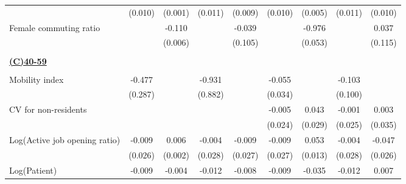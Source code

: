 \begin{tabular}{l*{8}{c}}
                    &     (0.010)         &     (0.001)         &     (0.011)         &     (0.009)         &     (0.010)         &     (0.005)         &     (0.011)         &     (0.010)         \\
\addlinespace
Female commuting ratio&                     &      -0.110\sym{***}&                     &      -0.039         &                     &      -0.976\sym{***}&                     &       0.037         \\
                    &                     &     (0.006)         &                     &     (0.105)         &                     &     (0.053)         &                     &     (0.115)         \\
\hline \\ \multicolumn{9}{l}{\textbf{\underline{(C)40-59}}} \\\\[-1ex]
Mobility index      &      -0.477\sym{*}  &                     &      -0.931         &                     &      -0.055         &                     &      -0.103         &                     \\
                    &     (0.287)         &                     &     (0.882)         &                     &     (0.034)         &                     &     (0.100)         &                     \\
\addlinespace
CV for non-residents&                     &                     &                     &                     &      -0.005         &       0.043         &      -0.001         &       0.003         \\
                    &                     &                     &                     &                     &     (0.024)         &     (0.029)         &     (0.025)         &     (0.035)         \\
\addlinespace
Log(Active job opening ratio)&      -0.009         &       0.006\sym{***}&      -0.004         &      -0.009         &      -0.009         &       0.053\sym{***}&      -0.004         &      -0.047\sym{*}  \\
                    &     (0.026)         &     (0.002)         &     (0.028)         &     (0.027)         &     (0.027)         &     (0.013)         &     (0.028)         &     (0.026)         \\
\addlinespace
Log(Patient)        &      -0.009         &      -0.004\sym{***}&      -0.012         &      -0.008         &      -0.009         &      -0.035\sym{***}&      -0.012         &       0.007         \\

\end{tabular}
